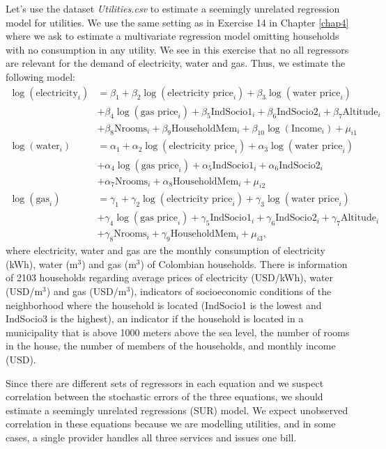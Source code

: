 Let's use the dataset \textit{Utilities.csv} to estimate a seemingly unrelated regression model for utilities. We use the same setting as in Exercise 14 in Chapter \ref{chap4} where we ask to estimate a multivariate regression model omitting households with no consumption in any utility. We see in this exercise that no all regressors are relevant for the demand of electricity, water and gas. Thus, we estimate the following model:
\begin{align*}
	\log(\text{electricity}_i) & = \beta_1 + \beta_2\log(\text{electricity price}_i)+\beta_3\log(\text{water price}_i)\\
	&+\beta_4\log(\text{gas price}_i)+\beta_5\text{IndSocio1}_i+\beta_6\text{IndSocio2}_i+\beta_7\text{Altitude}_i\\
	&+\beta_8\text{Nrooms}_i+\beta_9\text{HouseholdMem}_i+\beta_{10}\log(\text{Income}_i)+\mu_{i1}\\
	\log(\text{water}_i) & = \alpha_1 + \alpha_2\log(\text{electricity price}_i)+\alpha_3\log(\text{water price}_i)\\
	&+\alpha_4\log(\text{gas price}_i)+\alpha_5\text{IndSocio1}_i+\alpha_6\text{IndSocio2}_i\\
	&+\alpha_7\text{Nrooms}_i+\alpha_8\text{HouseholdMem}_i+\mu_{i2}\\
	\log(\text{gas}_i) & = \gamma_1 + \gamma_2\log(\text{electricity price}_i)+\gamma_3\log(\text{water price}_i)\\
	&+\gamma_4\log(\text{gas price}_i)+\gamma_5\text{IndSocio1}_i+\gamma_6\text{IndSocio2}_i+\gamma_7\text{Altitude}_i\\
	&+\gamma_8\text{Nrooms}_i+\gamma_9\text{HouseholdMem}_i+\mu_{i3},
\end{align*} 
where electricity, water and gas are the monthly consumption of electricity (kWh), water (m$^3$) and gas (m$^3$) of Colombian households. There is information of 2103 households regarding average prices of electricity (USD/kWh), water (USD/m$^3$) and gas (USD/m$^3$), indicators of socioeconomic conditions of the neighborhood where the household is located (IndSocio1 is the lowest and IndSocio3 is the highest), an indicator if the household is located in a municipality that is above 1000 meters above the sea level, the number of rooms in the house, the number of members of the households, and monthly income (USD).

Since there are different sets of regressors in each equation and we suspect correlation between the stochastic errors of the three equations, we should estimate a seemingly unrelated regressions (SUR) model. We expect unobserved correlation in these equations because we are modelling utilities, and in some cases, a single provider handles all three services and issues one bill.

